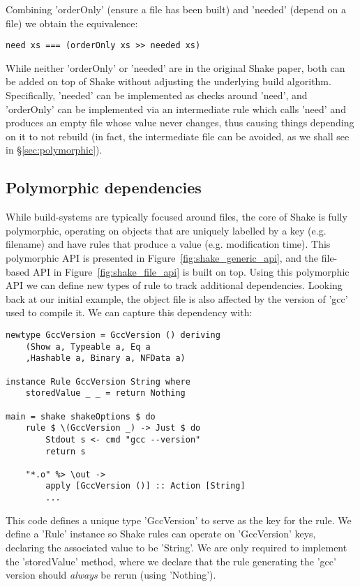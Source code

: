 Combining \lst'orderOnly' (ensure a file has been built) and \lst'needed' (depend on a file) we obtain the equivalence:

\begin{lstlisting}
need xs === (orderOnly xs >> needed xs)
\end{lstlisting}

While neither \lst'orderOnly' or \lst'needed' are in the original Shake paper, both can be added on top of Shake without adjusting the underlying build algorithm. Specifically, \lst'needed' can be implemented as checks around \lst'need', and \lst'orderOnly' can be implemented via an intermediate rule which calls \lst'need' and produces an empty file whose value never changes, thus causing things depending on it to not  rebuild (in fact, the intermediate file can be avoided, as we shall see in \S\ref{sec:polymorphic}).

\subsection{Polymorphic dependencies\label{sec:polymorphic}}

While build-systems are typically focused around files, the core of Shake is fully polymorphic, operating on objects that are uniquely labelled by a key (e.g. filename) and have rules that produce a value (e.g. modification time). This polymorphic API is presented in Figure~\ref{fig:shake_generic_api}, and the file-based API in Figure~\ref{fig:shake_file_api} is built on top. Using this polymorphic API we can define new types of rule to track additional dependencies. Looking back at our initial example, the object file is also affected by the version of \lst'gcc' used to compile it. We can capture this dependency with:

\begin{lstlisting}
newtype GccVersion = GccVersion () deriving
    (Show a, Typeable a, Eq a
    ,Hashable a, Binary a, NFData a)

instance Rule GccVersion String where
    storedValue _ _ = return Nothing

main = shake shakeOptions $ do
    rule $ \(GccVersion _) -> Just $ do
        Stdout s <- cmd "gcc --version"
        return s

    "*.o" %> \out ->
        apply [GccVersion ()] :: Action [String]
        ...
\end{lstlisting}

This code defines a unique type \lst'GccVersion' to serve as the key for the rule. We define a \lst'Rule' instance so Shake rules can operate on \lst'GccVersion' keys, declaring the associated value to be \lst'String'. We are only required to implement the \lst'storedValue' method, where we declare that the rule generating the \lst'gcc' version should \emph{always} be rerun (using \lst'Nothing').

